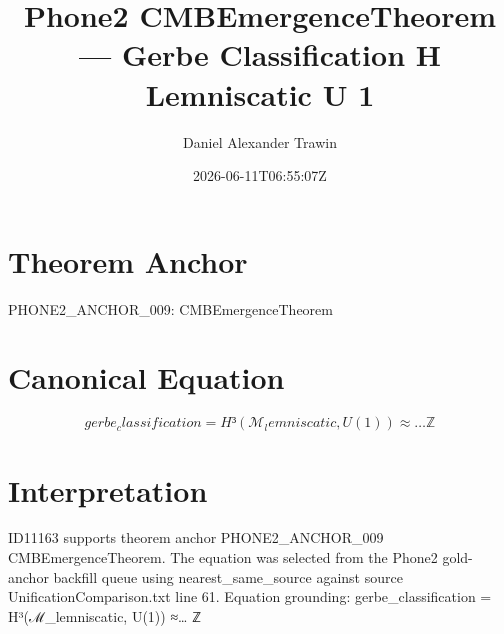 \documentclass[11pt]{article}
\title{Phone2 CMBEmergenceTheorem — Gerbe Classification H Lemniscatic U 1}
\author{Daniel Alexander Trawin}
\date{2026-06-11T06:55:07Z}
\begin{document}
\maketitle
\section*{Theorem Anchor}
PHONE2_ANCHOR_009: CMBEmergenceTheorem
\section*{Canonical Equation}
\[
gerbe_classification = H³(ℳ_lemniscatic, U(1)) ≈… ℤ
\]
\section*{Interpretation}
ID11163 supports theorem anchor PHONE2_ANCHOR_009 CMBEmergenceTheorem. The equation was selected from the Phone2 gold-anchor backfill queue using nearest_same_source against source UnificationComparison.txt line 61. Equation grounding: gerbe_classification = H³(ℳ_lemniscatic, U(1)) ≈… ℤ
\end{document}
